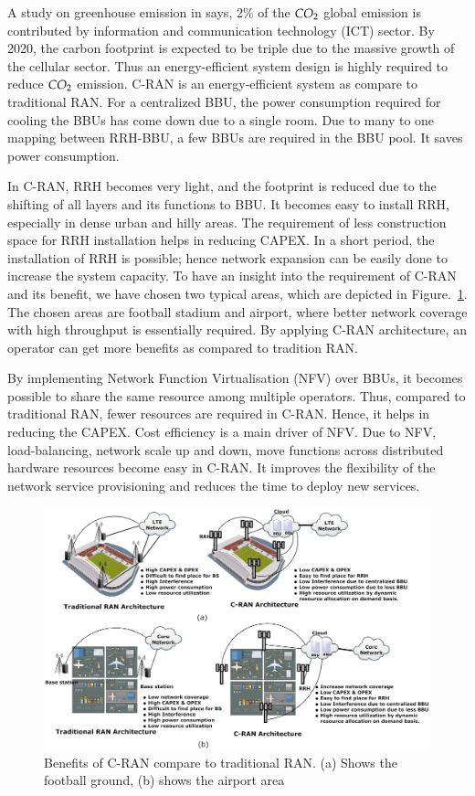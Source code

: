 \begin{multicols}{2}
A study on greenhouse emission in \cite{art3-key33} says, 2\% of the $CO_{\rm 2}$ global emission is contributed by information and communication technology (ICT) sector. By 2020, the carbon footprint is expected to be triple due to the massive growth of the cellular sector. Thus an energy-efficient system design is highly required to reduce $CO_{\rm 2}$ emission. C-RAN is an energy-efficient system as compare to traditional RAN. For a centralized BBU, the power consumption required for cooling the BBUs has come down due to a single room. Due to many to one mapping between RRH-BBU, a few BBUs are required in the BBU pool. It saves power consumption. 

In C-RAN, RRH becomes very light, and the footprint is reduced due to the shifting of all layers and its functions to BBU. It becomes easy to install RRH, especially in dense urban and hilly areas. The requirement of less construction space for RRH installation helps in reducing CAPEX. In a short period, the installation of RRH is possible; hence network expansion can be easily done to increase the system capacity. To have an insight into the requirement of C-RAN and its benefit, we have chosen two typical areas, which are depicted in Figure.~\ref{fig02}. The chosen areas are football stadium and airport, where better network coverage with high throughput is essentially required. By applying C-RAN architecture, an operator can get more benefits as compared to tradition RAN. 

By implementing Network Function Virtualisation (NFV) over BBUs, it becomes possible to share the same resource among multiple operators. Thus, compared to traditional RAN, fewer resources are required in C-RAN. Hence, it helps in reducing the CAPEX. Cost efficiency is a main driver of NFV. Due to NFV, load-balancing, network scale up and down, move functions across distributed hardware resources become easy in C-RAN. It improves the flexibility of the network service provisioning and reduces the time to deploy new services.
\end{multicols}

\begin{figure}[H]
\centering
\includegraphics[scale=.7]{src/Figures/chap3/fig02.jpg}
\caption{Benefits of C-RAN compare to traditional RAN. (a) Shows the football ground, (b) shows the airport area}\label{fig02}
\end{figure}

